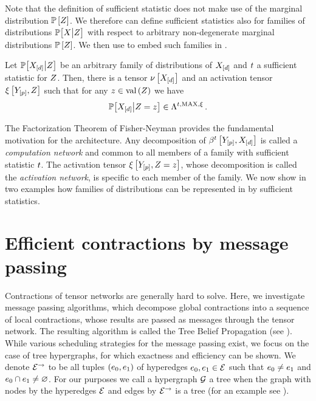 Note that the definition of sufficient statistic does not make use of the marginal distribution $\mathbb{P}\left[Z\right]$.
We therefore can define sufficient statistics also for families of distributions $\mathbb{P}\big[X\big|Z\big]$ with respect to arbitrary non-degenerate marginal distributions $\mathbb{P}\left[Z\right]$.
We then use  to embed such families in \CompActNets{}.

\begin{corollary}
    Let $\mathbb{P}\big[X_{[d]}\big|Z\big]$ be an arbitrary family of distributions of $X_{[d]}$ and $t$ a sufficient statistic for $Z$.
    Then, there is a tensor $\nu\left[X_{[d]}\right]$ and an activation tensor $\xi\left[Y_{[p]},Z\right]$ such that for any $z\in\mathrm{val}\left(Z\right)$ we have
    \begin{align*}
        \condprobat{\shortcatvariables}{\thirdcatvariable=\thirdcatindex} \in\cansof{\sstat,\maxgraph, \acttensor} \, . %
    \end{align*}
\end{corollary}

The Factorization Theorem of Fisher-Neyman provides the fundamental motivation for the \CompActNets{} architecture.
Any decomposition of $\bencodingofat{\sstat}{\headvariables,\shortcatvariables}$ is called a \emph{computation network} and common to all members of a family with sufficient statistic $t$.
The activation tensor $\xi\left[Y_{[p]},Z=z\right]$, whose decomposition is called the \emph{activation network}, is specific to each member of the family.
We now show in two examples how families of distributions can be represented in \CompActNets{} by sufficient statistics.





\section{Efficient contractions by message passing}

Contractions of tensor networks are generally hard to solve.
Here, we investigate message passing algorithms, which decompose global contractions into a sequence of local contractions, whose results are passed as messages through the tensor network.
The resulting algorithm is called the Tree Belief Propagation (see ).
While various scheduling strategies for the message passing exist, we focus on the case of tree hypergraphs, for which exactness and efficiency can be shown.
We denote $\mathcal{E}^{\rightarrow}$ to be all tuples $(e_{0},e_{1})$ of hyperedges $e_{0},e_{1}\in\mathcal{E}$ such that $e_{0}\neq e_{1}$ and $e_{0}\cap e_{1}\neq\varnothing$.
For our purposes we call a hypergraph $\mathcal{G}$ a tree when the graph with nodes by the hyperedges $\mathcal{E}$ and edges by $\mathcal{E}^{\rightarrow}$ is a tree (for an example see ).

